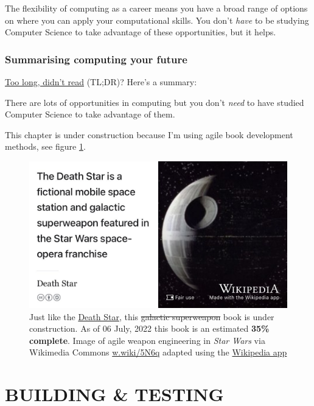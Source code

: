 \documentclass[
]{book}
\begin{document}
The flexibility of computing as a career means you have a broad range of options on where you can apply your computational skills. You don't \emph{have} to be studying Computer Science to take advantage of these opportunities, but it helps.

\hypertarget{tldr6}{%
\section{Summarising computing your future}\label{tldr6}}

\href{https://en.wiktionary.org/wiki/too_long;_didn\%27t_read}{Too long, didn't read} (TL;DR)? Here's a summary:

There are lots of opportunities in computing but you don't \emph{need} to have studied Computer Science to take advantage of them.

This chapter is under construction because I'm using agile book development methods, see figure \ref{fig:deathstar3-fig}.

\begin{figure}

{\centering \includegraphics[width=0.99\linewidth]{images/DeathStar2} 

}

\caption{Just like the \href{https://en.wikipedia.org/wiki/Death_Star}{Death Star}, this \sout{galactic superweapon} book is under construction. As of 06 July, 2022 this book is an estimated \textbf{35\% complete}. Image of agile weapon engineering in \emph{Star Wars} via Wikimedia Commons \href{https://w.wiki/5N6q}{w.wiki/5N6q} adapted using the \href{https://apps.apple.com/gb/app/wikipedia/id324715238}{Wikipedia app}}\label{fig:deathstar3-fig}
\end{figure}

\hypertarget{part-building-testing}{%
\part{BUILDING \& TESTING}\label{part-building-testing}}
\end{document}
